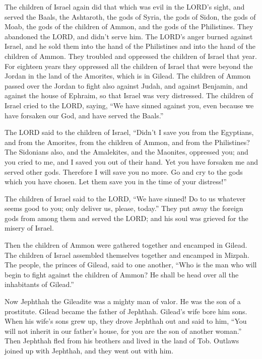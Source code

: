 \myverse{}The children of Israel again did that which was evil in the LORD’s
sight, and served the Baals, the Ashtaroth, the gods of Syria, the gods of Sidon, the gods of Moab, the
gods of the children of Ammon, and the gods of the Philistines. They abandoned the LORD, and didn’t serve
him.
\myverse{}The LORD’s anger burned against Israel, and he sold them into the hand of the
Philistines and into the hand of the children of Ammon.
\myverse{}They troubled and oppressed the children of Israel that year. For eighteen
years they oppressed all the children of Israel that were beyond the Jordan in the land of the Amorites,
which is in Gilead.
\myverse{}The children of Ammon passed over the Jordan to fight also against Judah, and
against Benjamin, and against the house of Ephraim, so that Israel was very distressed.
\myverse{}The children of Israel cried to the LORD, saying, “We have sinned against
you, even because we have forsaken our God, and have served the Baals.”

\myverse{}The LORD said to the children of Israel, “Didn’t I save you
from the Egyptians, and from the Amorites, from the children of Ammon, and from the Philistines?
\myverse{}The Sidonians also, and the Amalekites, and the Maonites, oppressed you;
and you cried to me, and I saved you out of their hand.
\myverse{}Yet you have forsaken me and served other gods. Therefore I will save you
no more.
\myverse{}Go and cry to the gods which you have chosen. Let them save you in the time
of your distress!”

\myverse{}The children of Israel said to the LORD, “We have sinned! Do
to us whatever seems good to you; only deliver us, please, today.”
\myverse{}They put away the foreign gods from among them and served the LORD; and his
soul was grieved for the misery of Israel.

\myverse{}Then the children of Ammon were gathered together and encamped
in Gilead. The children of Israel assembled themselves together and encamped in Mizpah.
\myverse{}The people, the princes of Gilead, said to one another, “Who is the man who
will begin to fight against the children of Ammon? He shall be head over all the inhabitants of Gilead.”


\mychapter{} \myverse*{}Now Jephthah the Gileadite was a mighty man of valor. He was the
son of a prostitute. Gilead became the father of Jephthah.
\myverse{}Gilead’s wife bore him sons. When his wife’s sons grew up, they drove Jephthah
out and said to him, “You will not inherit in our father’s house, for you are the son of another woman.”
\myverse{}Then Jephthah fled from his brothers and lived in the land of Tob. Outlaws
joined up with Jephthah, and they went out with him.

